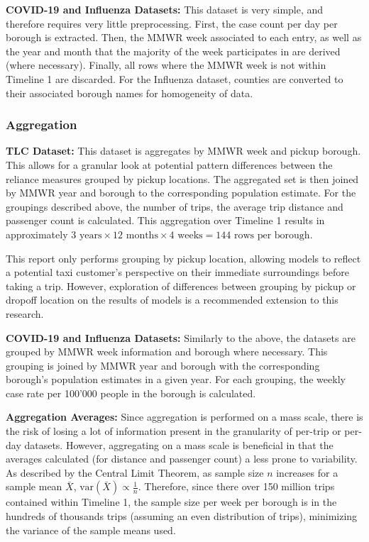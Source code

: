 \documentclass[11pt]{article}
\begin{document}
\textbf{COVID-19 and Influenza Datasets:}
This dataset is very simple, and therefore requires very little preprocessing.
First, the case count per day per borough is extracted. 
Then, the MMWR week associated to each entry, as well as the year and month that the majority of the week participates in are derived (where necessary).
Finally, all rows where the MMWR week is not within Timeline 1 are discarded.
For the Influenza dataset, 
counties are converted to their associated borough names for homogeneity of data.

\subsubsection{Aggregation}

\textbf{TLC Dataset:}
This dataset is aggregates by MMWR week and pickup borough.
This allows for a granular look at potential pattern differences between the reliance measures grouped by pickup locations.
The aggregated set is then joined by MMWR year and borough to the corresponding population estimate.
For the groupings described above, the number of trips,
the average trip distance and passenger count is calculated.
This aggregation over Timeline 1 results in approximately $3 \text{ years} \times 12 \text{ months} \times 4 \text{ weeks} = 144 \text{ rows per borough}$.

This report only performs grouping by pickup location,
allowing models to reflect a potential taxi customer's perspective on their immediate surroundings before taking a trip.
However, exploration of differences between grouping by pickup or dropoff location on the results of models 
is a recommended extension to this research.

\textbf{COVID-19 and Influenza Datasets:}
Similarly to the above, the datasets are grouped by MMWR week information and borough where necessary.
This grouping is joined by MMWR year and borough with the corresponding borough's population estimates in a given year.
For each grouping, the weekly case rate per 100'000 people in the borough is calculated.

\textbf{Aggregation Averages:}
Since aggregation is performed on a mass scale, there is the risk of losing a lot of information present in the granularity of per-trip or per-day datasets.
However, aggregating on a mass scale is beneficial in that the averages calculated (for distance and passenger count)
a less prone to variability. As described by the Central Limit Theorem, as sample size $n$ increases for a sample mean $\bar{X}$, 
$\text{var}(\bar{X}) \propto \frac{1}{n}$. Therefore, since there over 150 million trips contained within Timeline 1, the sample size per week per borough is in the hundreds of thousands trips (assuming an even distribution of trips),
minimizing the variance of the sample means used.
\end{document}
